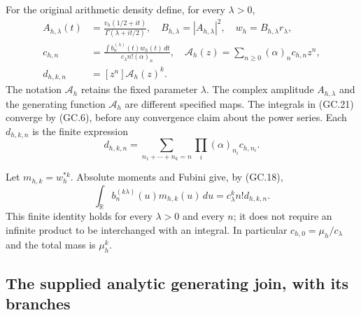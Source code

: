 For the original arithmetic density define, for every $\lambda>0$,
\[
 \begin{split}
 A_{h,\lambda}(t)&=\frac{v_h(1/2+it)}{\Gamma(\lambda+it/2)},
 \quad B_{h,\lambda}=|A_{h,\lambda}|^2,
 \quad w_h=B_{h,\lambda}r_\lambda,\\
 c_{h,n}&=\frac{\int b_n^{(\lambda)}(t)w_h(t)\,dt}
                 {c_\lambda n!(\alpha)_n},
 \quad\mathcal A_h(z)=\sum_{n\ge0}(\alpha)_nc_{h,n}z^n,\\
 d_{h,k,n}&=[z^n]\mathcal A_h(z)^k.
 \end{split}                                                   \tag{GC.21}
\]
The notation $\mathcal A_h$ retains the fixed parameter $\lambda$.
The complex amplitude $A_{h,\lambda}$ and the generating function
$\mathcal A_h$ are different specified maps. The integrals in
(GC.21) converge by (GC.6), before any convergence claim about the
power series. Each $d_{h,k,n}$ is the finite expression
\[
 d_{h,k,n}=\sum_{n_1+\cdots+n_k=n}
                   \prod_i(\alpha)_{n_i}c_{h,n_i}.             \tag{GC.22}
\]

Let $m_{h,k}=w_h^{*k}$. Absolute moments and Fubini give, by (GC.18),
\[
 \int_{\mathbb R}b_n^{(k\lambda)}(u)m_{h,k}(u)\,du
       =c_\lambda^k n!d_{h,k,n}.                              \tag{GC.23}
\]
This finite identity holds for every $\lambda>0$ and every $n$;
it does not require an infinite product to be interchanged with an
integral. In particular $c_{h,0}=\mu_h/c_\lambda$ and the total
mass is $\mu_h^k$.

\subsection{The supplied analytic generating join, with its branches}

